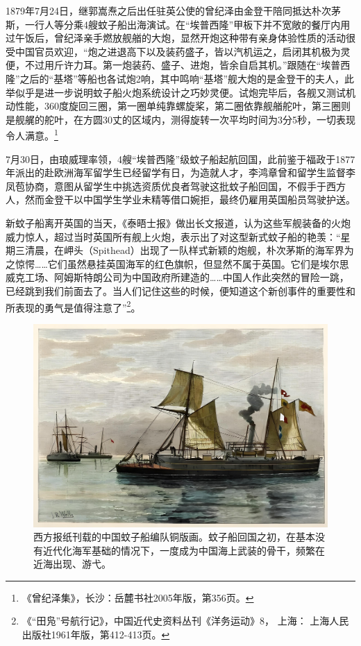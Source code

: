 \documentclass[12pt,UTF8]{ctexbook}
\begin{document}
1879年7月24日，继郭嵩焘之后出任驻英公使的曾纪泽由金登干陪同抵达朴次茅斯，一行人等分乘4艘蚊子船出海演试。在“埃普西隆”甲板下并不宽敞的餐厅内用过午饭后，曾纪泽亲手燃放舰艏的大炮，显然开炮这种带有亲身体验性质的活动很受中国官员欢迎，“炮之进退高下以及装药盛子，皆以汽机运之，启闭其机极为灵便，不过用斤许力耳。第一炮装药、盛子、进炮，皆余自启其机。”跟随在“埃普西隆”之后的“基塔”等船也各试炮2响，其中鸣响“基塔”舰大炮的是金登干的夫人，此举似乎是进一步说明蚊子船火炮系统设计之巧妙灵便。试炮完毕后，各舰又测试机动性能，360度旋回三圈，第一圈单纯靠螺旋桨，第二圈依靠舰艏舵叶，第三圈则是舰艉的舵叶，在方圆30丈的区域内，测得旋转一次平均时间为3分5秒，一切表现令人满意。\footnote{《曾纪泽集》，长沙：岳麓书社2005年版，第356页。}

7月30日，由琅威理率领，4艘“埃普西隆”级蚊子船起航回国，此前鉴于福政于1877年派出的赴欧洲海军留学生已经留学有日，为造就人才，李鸿章曾和留学生监督李凤苞协商，意图从留学生中挑选资质优良者驾驶这批蚊子船回国，不假手于西方人，然而金登干以中国学生学业未精等借口婉拒，最终仍雇用英国船员驾驶护送。

新蚊子船离开英国的当天，《泰晤士报》做出长文报道，认为这些军舰装备的火炮威力惊人，超过当时英国所有舰上火炮，表示出了对这型新式蚊子船的艳羡：“星期三清晨，在岬头（Spithead）出现了一队样式新颖的炮舰，朴次茅斯的海军界为之惊愕……它们虽然悬挂英国海军的红色旗帜，但显然不属于英国。它们是埃尔思威克工场、阿姆斯特朗公司为中国政府所建造的……中国人作此突然的冒险一跳，已经跳到我们前面去了。当人们记住这些的时候，便知道这个新创事件的重要性和所表现的勇气是值得注意了”\footnote{《“田凫”号航行记》，中国近代史资料丛刊《洋务运动》8， 上海： 上海人民出版社1961年版，第412-413页。}。

\begin{figure}[htbp]
	\centering
	\includegraphics[width=1\linewidth]{Images/11}
	\caption{西方报纸刊载的中国蚊子船编队铜版画。蚊子船回国之初，在基本没有近代化海军基础的情况下，一度成为中国海上武装的骨干，频繁在近海出现、游弋。}
	\label{fig:1}
\end{figure}
\end{document}
